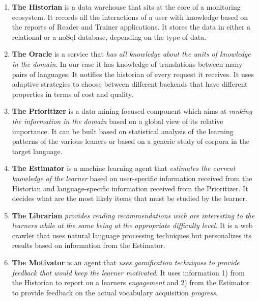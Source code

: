 \newcommand {\archiblock}[1]{\item {\bf #1}}
\begin{enumerate}
	
		\archiblock{The Historian} is a data warehouse that sits at the core of a monitoring ecosystem. It records all the interactions of a user with knowledge based on the reports of Reader and Trainer applications.
		It stores the data in either a relational or a noSql database, depending on the type of data.

		\archiblock{The Oracle} is a service that {\em has all knowledge about the units of knowledge in the domain}. In our case it has knowledge of translations between many pairs of languages. It notifies the historian of every request it receives. 
		It uses adaptive strategies to choose between different backends that have different properties in terms of cost and quality.

		\archiblock{The Prioritizer} is a data mining focused component which aims at {\em ranking the information in the domain} based on a global view of its relative importance. It can be built based on statistical analysis of the learning patterns of the various leaners or based on a generic study of corpora in the target language.

		\archiblock{The Estimator} is a machine learning agent that {\em estimates the current knowledge of the learner} based on user-specific information received from the Historian and language-specific information received from the Prioritizer. It decides what are the most likely items that must be studied by the learner. 

		\archiblock {The Librarian} {\em provides reading recommendations wich are interesting to the learners while at the same being at the appropriate difficulty level}. It is a web crawler that uses natural language processing techniques but personalizes its results based on  information from the Estimator.

		\archiblock {The Motivator} is an agent that {\em uses gamification techniques to provide feedback that would keep the learner motivated}. It uses information 1) from the Historian to report on a learners {\em engagement} and 2) from the Estimator to provide feedback on the actual vocabulary acquisition {\em progress}. 

\end{enumerate}





